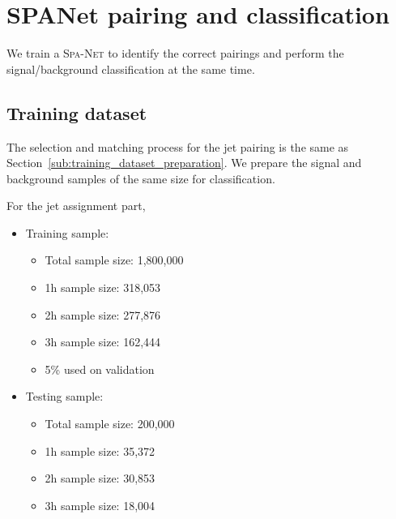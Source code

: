 \documentclass[12pt]{article}
\begin{document}
\section{SPANet pairing and classification}%
\label{sec:spanet_pairing_and_classification}

    We train a \textsc{Spa-Net} to identify the correct pairings and perform the signal/background classification at the same time.

    \subsection{Training dataset}%
    \label{sub:training_dataset_classification}
        The selection and matching process for the jet pairing is the same as Section~\ref{sub:training_dataset_preparation}. We prepare the signal and background samples of the same size for classification.

        For the jet assignment part,
        \begin{itemize}
            \item Training sample:
            \begin{itemize}
                \item Total sample size: 1,800,000
                \item 1h sample size: 318,053
                \item 2h sample size: 277,876
                \item 3h sample size: 162,444
                \item 5\% used on validation
            \end{itemize}
            \item Testing sample:
            \begin{itemize}
                \item Total sample size: 200,000
                \item 1h sample size: 35,372
                \item 2h sample size: 30,853
                \item 3h sample size: 18,004
            \end{itemize}
        \end{itemize}
\end{document}
